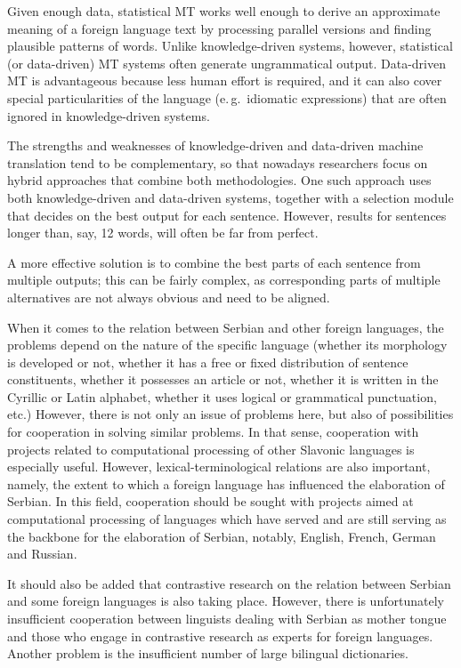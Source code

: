 {\begin{multicols}{2}
Given enough data, statistical MT works well enough to derive an approximate meaning of a foreign language text by processing parallel versions and finding plausible patterns of words. Unlike knowledge-driven systems, however, statistical (or data-driven) MT systems often generate ungrammatical output. Data-driven MT is advantageous because less human effort is required, and it can also cover special particularities of the language (e.\,g.~idiomatic expressions) that are often ignored in knowledge-driven systems. 

The strengths and weaknesses of knowledge-driven and data-driven machine translation tend to be complementary, so that nowadays researchers focus on hybrid approaches that combine both methodologies. One such approach uses both knowledge-driven and data-driven systems, together with a selection module that decides on the best output for each sentence. However, results for sentences longer than, say, 12 words, will often be far from perfect. 

A more effective solution is to combine the best parts of each sentence from multiple outputs; this can be fairly complex, as corresponding parts of multiple alternatives are not always obvious and need to be aligned. 


When it comes to the relation between Serbian and other foreign languages, the problems depend on the nature of the specific language (whether its morphology is developed or not, whether it has a free or fixed distribution of sentence constituents, whether it possesses an article or not, whether it is written in the Cyrillic or Latin alphabet, whether it uses logical or grammatical punctuation, etc.) However, there is not only an issue of problems here, but also of possibilities for cooperation in solving similar problems. In that sense, cooperation with projects related to computational processing of other Slavonic languages is especially useful. However, lexical-terminological relations are also important, namely, the extent to which a foreign language has influenced the elaboration of Serbian. In this field, cooperation should be sought with projects aimed at computational processing of languages which have served and are still serving as the backbone for the elaboration of Serbian, notably, English, French, German and Russian.

It should also be added that contrastive research on the relation between Serbian and some foreign languages is also taking place. However, there is unfortunately insufficient cooperation between linguists dealing with Serbian as mother tongue and those who engage in contrastive research as experts for foreign languages. Another problem is the insufficient number of large bilingual dictionaries. 


\end{multicols}}
